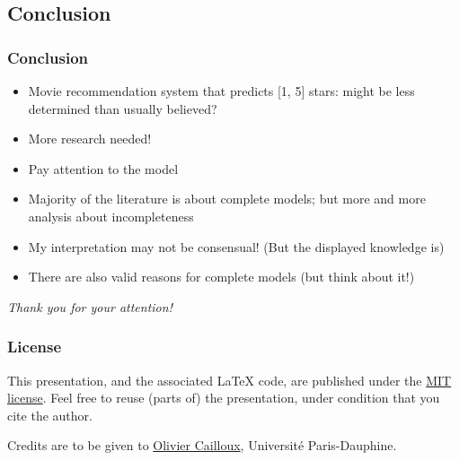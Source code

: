 \documentclass[french,english]{beamer}
\begin{document}
\subsection{Conclusion}
\begin{frame}
	\frametitle{Conclusion}
	\begin{itemize}
		\item Movie recommendation system that predicts [1, 5] stars: might be less determined than usually believed?
		\item More research needed!
		\item Pay attention to the model
		\item Majority of the literature is about complete models; but more and more analysis about incompleteness
		\item My interpretation may not be consensual! (But the displayed knowledge is)
		\item There are also valid reasons for complete models (but think about it!)
	\end{itemize}
\end{frame}

\begin{frame}[plain]
	\addtocounter{framenumber}{-1}
	\begin{center}
		\huge
		\textit{Thank you for your attention!}
	\end{center}
\end{frame}

\appendix
\AtBeginSection{
}

\clearpage{}
\begin{frame}[allowframebreaks]
	\frametitle{\refname}
 	
\end{frame}

\clearpage{}
\begin{frame}[plain]
	\frametitle{License}
	This presentation, and the associated \LaTeX{} code, are published under the \href{http://opensource.org/licenses/MIT}{MIT license}. Feel free to reuse (parts of) the presentation, under condition that you cite the author.
	
	Credits are to be given to \href{http://www.lamsade.dauphine.fr/~ocailloux/}{Olivier Cailloux}, Université Paris-Dauphine.
\end{frame}
\addtocounter{framenumber}{-1}
\end{document}
